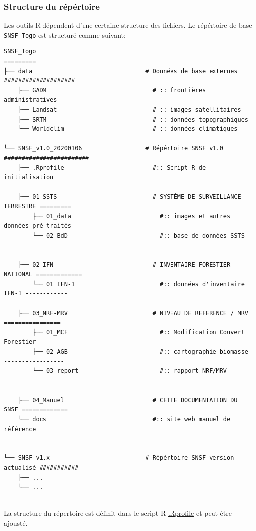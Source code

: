\documentclass[a4paper, notitlepage, 12pt, krantz2]{krantz}
\begin{document}
\hypertarget{structure-du-repertoire}{%
\subsubsection{Structure du répértoire}\label{structure-du-repertoire}}

Les outils R dépendent d'une certaine structure des fichiers. Le répértoire de base \texttt{SNSF\_Togo} est structuré comme suivant:

\begin{verbatim}
SNSF_Togo
=========
├── data                                # Données de base externes ####################
    ├── GADM                              # :: frontières administratives
    ├── Landsat                           # :: images satellitaires
    ├── SRTM                              # :: données topographiques
    └── Worldclim                         # :: données climatiques
    
└── SNSF_v1.0_20200106                  # Répértoire SNSF v1.0 ########################
    ├── .Rprofile                         #:: Script R de initialisation
    
    ├── 01_SSTS                           # SYSTÈME DE SURVEILLANCE TERRESTRE =========
        ├── 01_data                         #:: images et autres données pré-traités --
        └── 02_BdD                          #:: base de données SSTS ------------------
        
    ├── 02_IFN                            # INVENTAIRE FORESTIER NATIONAL =============
        └── 01_IFN-1                        #:: données d'inventaire IFN-1 ------------
    
    ├── 03_NRF-MRV                        # NIVEAU DE REFERENCE / MRV  ================
        ├── 01_MCF                          #:: Modification Couvert Forestier --------
        ├── 02_AGB                          #:: cartographie biomasse -----------------
        └── 03_report                       #:: rapport NRF/MRV -----------------------
        
    ├── 04_Manuel                         # CETTE DOCUMENTATION DU SNSF =============
    └── docs                              #:: site web manuel de référence
    
    
└── SNSF_v1.x                           # Répértoire SNSF version actualisé ###########
    ├── ...
    └── ...
    
\end{verbatim}

La structure du répertoire est définit dans le script R \protect\hyperlink{NRF-set-up.R}{.Rprofile} et peut être ajousté.
\end{document}
